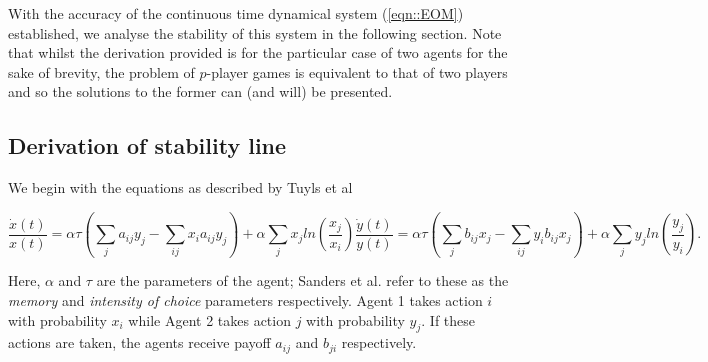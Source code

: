 \documentclass[.../main.tex]{subfiles}
\begin{document}
    With the accuracy of the continuous time dynamical system
    (\ref{eqn::EOM}) established, we analyse the stability of this
    system in the following section. Note that whilst the derivation
    provided is for the particular case of two agents for the sake of
    brevity, the problem of $p$-player games is equivalent to that of
    two players and so the solutions to the former can (and will) be
    presented.

    
     \subsection{Derivation of stability line} %
     \label{sub:derivation_of_stability_line}
     
     We begin with the equations as described by Tuyls et al \cite{Tuyls2006AnGames} 

    \begin{subequations}
    \label{eqn::EOM}
        \begin{equation}
            \frac{\dot{x}(t)}{x(t)} = \alpha \tau (\sum_{j} a_{ij} y_j - \sum_{i j} x_i a_{ij} y_j)
            + \alpha \sum_j x_j ln(\frac{x_j}{x_i}) 
        \end{equation}
        \begin{equation}
            \frac{\dot{y}(t)}{y(t)} = \alpha \tau (\sum_{j} b_{ij} x_j - \sum_{i j} y_i b_{ij} x_j)
            + \alpha \sum_j y_j ln(\frac{y_j}{y_i}).
        \end{equation}
    \end{subequations}

    Here, $\alpha$ and $\tau$ are the parameters of the agent; Sanders
    et al. refer to these as the {\em memory} and {\em intensity of choice}
    parameters respectively. Agent 1 takes action $i$ with probability
    $x_i$ while Agent 2 takes action $j$ with probability $y_j$. If
    these actions are taken, the agents receive payoff $a_{ij}$ and
    $b_{ji}$ respectively.
\end{document}
